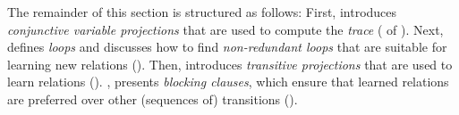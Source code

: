 The remainder of this section is structured as follows:
%
First,  introduces \emph{conjunctive variable projections} that are used to
compute the \emph{trace} ( of ).
%
Next,  defines \emph{loops} and
discusses how to find \emph{non-redundant loops} that are suitable for learning new relations ().
%
Then,  introduces \emph{transitive projections}
that are used to learn relations ().
,  presents
\emph{blocking clauses}, which ensure that learned re\-la\-tions are preferred over other (sequences of) transitions
().


